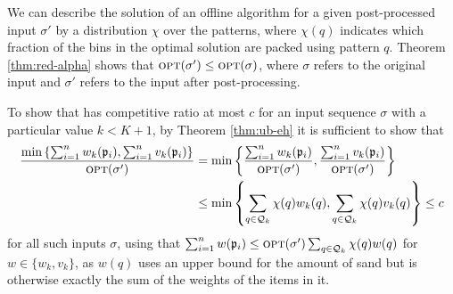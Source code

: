 \iffalse 
following terms.
\begin{itemize}
	\item
	For $i=1,\dots,\rTypes-1, i\not=t(\smallestred)$, we have a term $q_i w(t_{i},i,\N)$ (the mark is irrelevant here:
	either $\smallestred$ is medium and then $t(\smallestred)$ is the unique type such that $\needs(t(\smallestred))=k$,
	or $\smallestred$ is not medium and then items of class $k$ have no mark).
	\item 
	For $i=t(\smallestred)$, if $s(\smallestred)>1/3$, we have a term $(q_{t(\smallestred)}^\B+q_{t(\smallestred)}^\N))w(t_{t(\smallestred)},t(\smallestred),\N) + q_{t(\smallestred)}^\R w(t_{t(\smallestred)},t(\smallestred),\R)$, else we have a term
	$q_{t(\smallestred)} w(t_{t(\smallestred)},t(\smallestred),\emptyset)$ (these items are not marked in this case)
	\item 
	For $i=\rTypes$, there is a term $w(1-\sum_{i=1}^{\rTypes-1} q_it_{i+1},\rTypes,\emptyset)$ (these items are not marked; the first argument is an upper bound for the volume left for sand. This 
\end{itemize}
\fi 

We can describe the solution of an offline algorithm for a given post-processed input $\sigma'$ by a distribution $\chi$ over
the patterns, where $\chi(q)$ indicates which fraction of the bins 
in the optimal solution are packed using pattern $q$. 
Theorem \ref{thm:red-alpha} shows that $\mbox{\textsc{opt}}(\sigma')\le\mbox{\textsc{opt}}(\sigma)$, where $\sigma$ refers to the original input and $\sigma'$ refers to the input after post-processing.

To show that \EHarm{} has competitive ratio at most $c$ for an input sequence
$\sigma$ with
{a particular value } $k<K+1$, by Theorem \ref{thm:ub-eh} it is sufficient to show that
\begin{align}
\frac{\min\left\{ 
	\sum_{i=1}^n w_k(\mathfrak{p}_i),\sum_{i=1}^n v_k(\mathfrak{p}_i)
	\right\}}{\mbox{\textsc{opt}}(\sigma')} &= 
\min\left\{ 
\frac{\sum_{i=1}^n w_k(\mathfrak{p}_i)}{\mbox{\textsc{opt}}(\sigma')},\frac{\sum_{i=1}^n v_k(\mathfrak{p}_i)}{\mbox{\textsc{opt}}(\sigma')}
\right\}\\
& \le \min\left\{ 
{\sum_{q\in \mathcal{Q}_k} \chi(q) w_k(q)},{\sum_{q\in \mathcal{Q}_k} \chi(q) v_k(q)}
\right\}\le c
\label{eq:compratio}
\end{align}
for all such inputs $\sigma$, using that
$\sum_{i=1}^n w(\mathfrak{p}_i) \le {\mbox{\textsc{opt}}(\sigma')}\sum_{q\in \mathcal{Q}_k} \chi(q) w(q)$ for $w\in\{w_k,v_k\}$,
as $w(q)$ uses an upper bound for the amount of sand but is otherwise exactly the sum of the weights
of the items in it.


